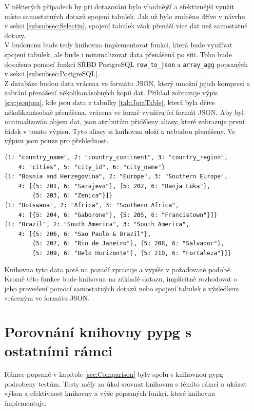 \documentclass[ing,male,java,dept456]{diploma}						%
\begin{document}
V některých případech by při dotazování bylo vhodnější a efektivnější využít místo samostatných dotazů spojení tabulek. Jak už bylo zmíněno dříve v návrhu v sekci \ref{subsubsec:Selectin}, spojení tabulek však přenáší více dat než samostatné dotazy. \\ 
V budoucnu bude tedy knihovna implementovat funkci, která bude využívat spojení tabulek, ale bude i minimalizovat data přenášená po síti. Toho bude dosaženo pomocí funkcí SŘBD PostgreSQL \lstinline[style=inlinepython]|row_to_json| a \lstinline[style=inlinepython]|array_agg| popsaných v sekci \ref{subsubsec:PostgreSQL}. \\
Z databáze budou data vrácena ve formátu JSON, který umožní jejich kompresi a zabrání přenášení několikanásobných kopií dat. Příklad zobrazuje výpis \ref{src:jsonjoin}, kde jsou data z tabulky \ref{tab:JoinTable}, která byla dříve několikanásobně přenášena, vrácena ve formě využívající formát JSON. Aby byl minimalizován objem dat, jsou atributům přiděleny aliasy, které zobrazuje první řádek v tomto výpisu. Tyto aliasy si knihovna uloží a nebudou přenášeny. Ve výpisu jsou pouze pro přehlednost. \\
\begin{lstlisting}[style=custompython, label=src:jsonjoin, caption={Minimalizace přenášených dat z tabulky \ref{tab:JoinTable} pomocí formátu JSON}]
{1: "country_name", 2: "country_continent", 3: "country_region", 
	4: "cities", 5: "city_id", 6: "city_name"}
{1: "Bosnia and Herzegovina", 2: "Europe", 3: "Southern Europe", 
	4: [{5: 201, 6: "Sarajevo"}, {5: 202, 6: "Banja Luka"}, 
		{5: 203, 6: "Zenica"}]}
{1: "Botswana", 2: "Africa", 3: "Southern Africa", 
	4: [{5: 204, 6: "Gaborone"}, {5: 205, 6: "Francistown"}]}
{1: "Brazil", 2: "South America", 3: "South America", 
	4: [{5: 206, 6: "Sao Paulo & Brazil"}, 
		{5: 207, 6: "Rio de Janeiro"}, {5: 208, 6: "Salvador"}, 
		{5: 209, 6: "Belo Horizonte"}, {5: 210, 6: "Fortaleza"}]}
\end{lstlisting}

Knihovna tyto data poté na pozadí zpracuje a vypíše v požadované podobě. \\
Kromě této funkce bude knihovna na základě dotazu, implicitně rozhodovat o jeho provedení pomocí samostatných dotazů nebo spojení tabulek s výsledkem vráceným ve formátu JSON.

\section{Porovnání knihovny pypg s ostatními rámci}
\label{sec:Bench}
Rámce popsané v kapitole \ref{sec:Comparison} byly spolu s knihovnou pypg podrobeny testům. Testy měly za úkol srovnat knihovnu s těmito rámci a ukázat výkon a efektivnost knihovny a výše popsaných funkcí, které knihovna implementuje.
\end{document}
